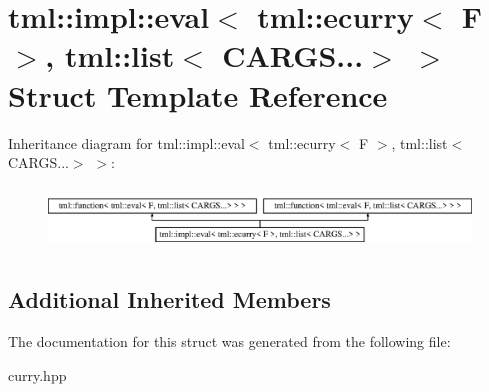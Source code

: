 \hypertarget{structtml_1_1impl_1_1eval_3_01tml_1_1ecurry_3_01F_01_4_00_01tml_1_1list_3_01CARGS_8_8_8_4_01_4}{\section{tml\+:\+:impl\+:\+:eval$<$ tml\+:\+:ecurry$<$ F $>$, tml\+:\+:list$<$ C\+A\+R\+G\+S...$>$ $>$ Struct Template Reference}
\label{structtml_1_1impl_1_1eval_3_01tml_1_1ecurry_3_01F_01_4_00_01tml_1_1list_3_01CARGS_8_8_8_4_01_4}
}
Inheritance diagram for tml\+:\+:impl\+:\+:eval$<$ tml\+:\+:ecurry$<$ F $>$, tml\+:\+:list$<$ C\+A\+R\+G\+S...$>$ $>$\+:\begin{figure}[H]
\begin{center}
\leavevmode
\includegraphics[height=1.712538cm]{structtml_1_1impl_1_1eval_3_01tml_1_1ecurry_3_01F_01_4_00_01tml_1_1list_3_01CARGS_8_8_8_4_01_4}
\end{center}
\end{figure}
\subsection*{Additional Inherited Members}


The documentation for this struct was generated from the following file\+:\begin{DoxyCompactItemize}
\item 
curry.\+hpp\end{DoxyCompactItemize}
